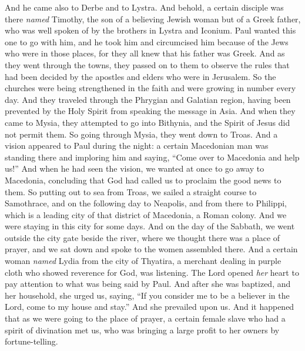 \begin{biblechapter} %
 And he came also to Derbe and to Lystra. And behold, a certain disciple was there \textit{named} Timothy, the son of a believing Jewish woman but of a Greek father,
\verse who was well spoken of by the brothers in Lystra and Iconium.
\verse Paul wanted this one to go with him, and he took him and circumcised him because of the Jews who were in those places, for they all knew that his father was Greek.
\verse And as they went through the towns, they passed on to them to observe the rules that had been decided by the apostles and elders who were in Jerusalem.
\verse So the churches were being strengthened in the faith and were growing in number every day.
 And they traveled through the Phrygian and Galatian region, having been prevented by the Holy Spirit from speaking the message in Asia.
\verse And when they came to Mysia, they attempted to go into Bithynia, and the Spirit of Jesus did not permit them.
\verse So going through Mysia, they went down to Troas.
\verse And a vision appeared to Paul during the night: a certain Macedonian man was standing there and imploring him and saying, “Come over to Macedonia and help us!”
\verse And when he had seen the vision, we wanted at once to go away to Macedonia, concluding that God had called us to proclaim the good news to them.
 So putting out to sea from Troas, we sailed a straight course to Samothrace, and on the following day to Neapolis,
\verse and from there to Philippi, which is a leading city of that district of Macedonia, a Roman colony. And we were staying in this city for some days.
\verse And on the day of the Sabbath, we went outside the city gate beside the river, where we thought there was a place of prayer, and we sat down and spoke to the women assembled there.
\verse And a certain woman \textit{named} Lydia from the city of Thyatira, a merchant dealing in purple cloth who showed reverence for God, was listening. The Lord opened \textit{her} heart to pay attention to what was being said by Paul.
\verse And after she was baptized, and her household, she urged us, saying, “If you consider me to be a believer in the Lord, come to my house and stay.” And she prevailed upon us.
 And it happened that as we were going to the place of prayer, a certain female slave who had a spirit of divination met us, who was bringing a large profit to her owners by fortune-telling.

\end{biblechapter}
